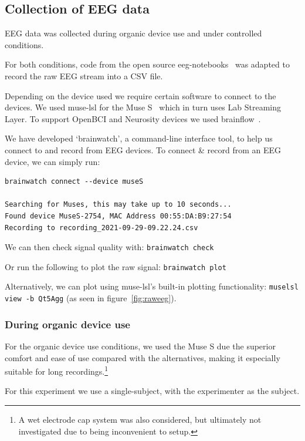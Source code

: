     \subsection{Collection of EEG data}

        EEG data was collected during organic device use and under controlled conditions.

        For both conditions, code from the open source eeg-notebooks~\cite{barachant_eeg-notebooks_2020} was adapted to record the raw EEG stream into a CSV file.

        Depending on the device used we require certain software to connect to the devices. We used muse-lsl for the Muse S~\cite{muse-lsl} which in turn uses Lab Streaming Layer. To support OpenBCI and Neurosity devices we used brainflow~\cite{noauthor_brainflow_2020}.

        We have developed `brainwatch', a command-line interface tool, to help us connect to and record from EEG devices. To connect \& record from an EEG device, we can simply run:

\begin{verbatim}
brainwatch connect --device museS

Searching for Muses, this may take up to 10 seconds...
Found device MuseS-2754, MAC Address 00:55:DA:B9:27:54
Recording to recording_2021-09-29-09.22.24.csv
\end{verbatim}

        We can then check signal quality with: \texttt{brainwatch check}

        Or run the following to plot the raw signal: \texttt{brainwatch plot}

        Alternatively, we can plot using muse-lsl's built-in plotting functionality: \texttt{muselsl view -b Qt5Agg} (as seen in figure~\ref{fig:raweeg}).

        \subsubsection*{During organic device use}

            For the organic device use conditions, we used the Muse S due the superior comfort and ease of use compared with the alternatives, making it especially suitable for long recordings.\footnote{A wet electrode cap system was also considered, but ultimately not investigated due to being inconvenient to setup.}

            For this experiment we use a single-subject, with the experimenter as the subject.

